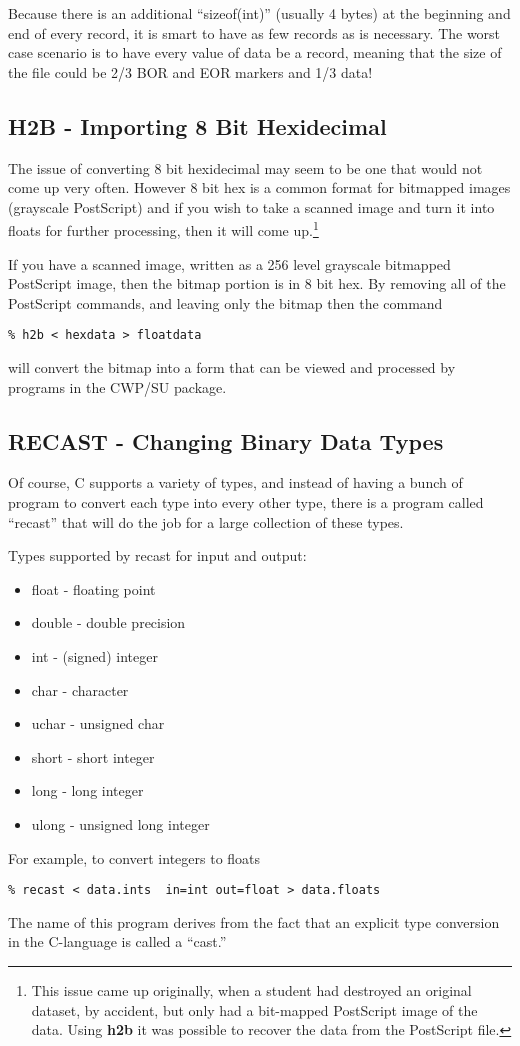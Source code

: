 {{{Because there is an additional ``sizeof(int)'' (usually 4 bytes)
at the beginning and end of every record, it is smart to have as few
records as is necessary. The worst case scenario is to have every
value of data be a record, meaning that the size of the file could
be 2/3 BOR and EOR markers and 1/3 data!

\subsection{H2B - Importing 8 Bit Hexidecimal}

The issue of converting 8 bit hexidecimal may seem to be one
that would not come up very often.
However 8 bit hex is a common format for bitmapped images
(grayscale PostScript) and if you wish to take a scanned image
and turn it into floats for further processing, then it will
come up.\footnote{This issue came up originally, when a student
had destroyed an original dataset, by accident, but only had
a bit-mapped PostScript image of the data. Using {\bf h2b}
it was possible to recover the data from the PostScript file.}

If you have a scanned image, written as a 256 level grayscale
bitmapped PostScript image, then the bitmap portion is in  8 bit hex.
By removing all of the PostScript commands, and leaving only the
bitmap then the command
{\small\begin{verbatim}
% h2b < hexdata > floatdata
\end{verbatim}}\noindent
will convert the bitmap into a form that can be viewed and processed
by programs in the CWP/SU package.

\subsection{RECAST - Changing Binary Data Types}

Of course, C supports a variety of types, and instead of having
a bunch of program to convert each type into every other type,
there is a program called ``recast'' that will do the job for a
large collection of these types. 

Types supported by recast for input and output:
\begin{itemize}
\item float - floating point
\item double - double precision
\item int - (signed) integer
\item char - character
\item uchar - unsigned char
\item short - short integer
\item long - long integer
\item ulong - unsigned long integer
\end{itemize}
For example, to convert integers to floats
{\small\begin{verbatim}
% recast < data.ints  in=int out=float > data.floats
\end{verbatim}}\noindent
The name of this program derives from the fact that an explicit
type conversion in the C-language is called a ``cast.''

}}}
